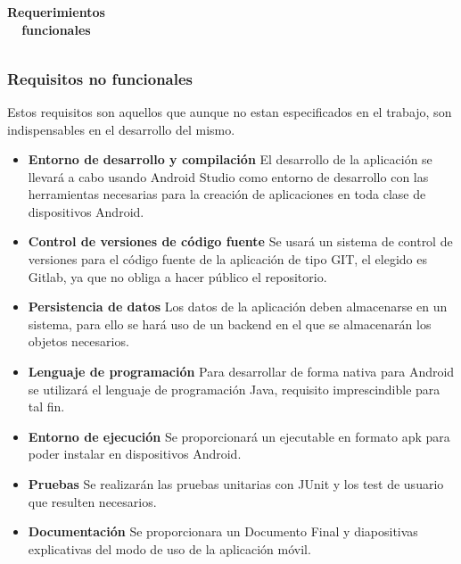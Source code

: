 \begin{table}[h!]
\begin{center}
\begin{tabular}[c]{|p{4cm}|p{4cm}|p{6cm}|}
\end{tabular}
\caption{\textbf{Requerimientos funcionales}}
\end{center}
\end{table}

\subsubsection{Requisitos no funcionales}
Estos requisitos son aquellos que aunque no estan especificados en el trabajo, son indispensables en el desarrollo del mismo.

\begin{itemize}
\item \textbf{Entorno de desarrollo y compilación }
El desarrollo de la aplicación se llevará a cabo usando Android Studio como entorno de desarrollo con las herramientas necesarias para la creación de aplicaciones en toda clase de dispositivos Android.
\item \textbf{Control de versiones de código fuente}
Se usará un sistema de control de versiones para el código fuente de la
aplicación de tipo GIT, el elegido es Gitlab, ya que no obliga a hacer público el repositorio.
\item \textbf{Persistencia de datos}
Los datos de la aplicación deben almacenarse en un sistema, para ello se hará uso de un backend en el que se almacenarán los objetos necesarios.
\item \textbf{Lenguaje de programación}
Para desarrollar de forma nativa para Android se utilizará el lenguaje de
programación Java, requisito imprescindible para tal fin.
\item \textbf{Entorno de ejecución}
Se proporcionará un ejecutable en formato apk para poder instalar en dispositivos Android.
\item \textbf{Pruebas}
Se realizarán las pruebas unitarias con JUnit y los test de usuario que resulten necesarios.
\item \textbf{Documentación}
Se proporcionara un Documento Final y diapositivas explicativas del modo de uso de la aplicación móvil.
\end{itemize}

